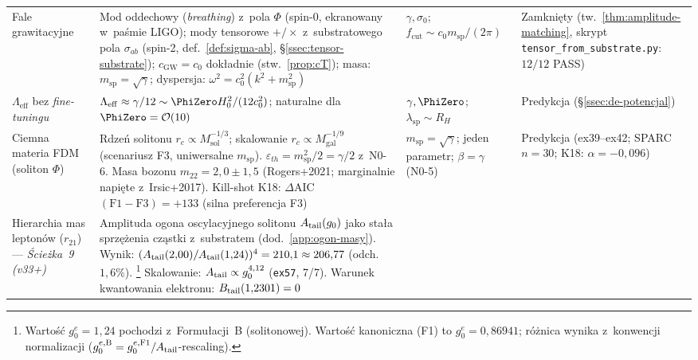 \begin{center}
\begin{tabular}{@{}>{\raggedright}p{2.5cm}p{5.5cm}p{2.2cm}p{2.5cm}@{}}
Fale grawitacyjne
  & Mod oddechowy (\emph{breathing}) z~pola $\Phi$ (spin-0,
    ekranowany w~pa\'smie LIGO); mody tensorowe $+/\times$
    z~substratowego pola $\sigma_{ab}$ (spin-2,
    def.~\ref{def:sigma-ab}, \S\ref{ssec:tensor-substrate});
    $c_{\mathrm{GW}} = c_0$ dok\l{}adnie (stw.~\ref{prop:cT});
    masa: $m_{\mathrm{sp}} = \sqrt{\gamma}$;
    dyspersja: $\omega^2 = c_0^2(k^2 + m_{\mathrm{sp}}^2)$
  & $\gamma, \sigma_0$;\newline $f_{\mathrm{cut}} \sim c_0 m_{\mathrm{sp}}/(2\pi)$
  & Zamkni\k{e}ty (tw.~\ref{thm:amplitude-matching}, skrypt \texttt{tensor\_from\_substrate.py}: $12/12$ PASS) \\[4pt]
$\Lambda_{\mathrm{eff}}$ bez \emph{fine-tuningu}
  & $\Lambda_{\mathrm{eff}} \approx \gamma/12
    \sim \PhiZero H_0^2/(12 c_0^2)$;
    naturalne dla $\PhiZero = \mathcal{O}(10)$
  & $\gamma, \PhiZero$;\newline
    $\lambda_{\mathrm{sp}} \sim R_H$
  & Predykcja (\S\ref{ssec:de-potencjal}) \\[4pt]
Ciemna materia FDM (soliton $\Phi$)
  & Rdze\'n solitonu $r_c \propto M_{\mathrm{sol}}^{-1/3}$;
    skalowanie $r_c \propto M_{\mathrm{gal}}^{-1/9}$
    (scenariusz F3, uniwersalne $m_{\mathrm{sp}}$).
    $\varepsilon_{th} = m_{\mathrm{sp}}^2/2 = \gamma/2$ z~N0-6.
    Masa bozonu $m_{22} = 2{,}0 \pm 1{,}5$
    (Rogers+2021; marginalnie napi\k{e}te z~Irsic+2017).
    Kill-shot K18: $\Delta$AIC$(\mathrm{F1-F3}) = +133$
    (silna preferencja F3)
  & $m_{\mathrm{sp}} = \sqrt{\gamma}$;\newline
    jeden parametr;\newline
    $\beta = \gamma$ (N0-5)
  & Predykcja (ex39--ex42;\newline
    SPARC $n=30$;\newline
    K18: $\alpha=-0{,}096$) \\[4pt]
Hierarchia mas lepton\'ow ($r_{21}$) --- \emph{\'Scie\.zka~9 (v33+)}
  & Amplituda ogona oscylacyjnego solitonu $A_{\rm tail}(g_0)$ jako
    sta\l{}a sprz\k{e}\.zenia cz\k{a}stki z~substratem
    (dod.~\ref{app:ogon-masy}).
    Wynik: $(A_{\rm tail}(2{,}00)/A_{\rm tail}(1{,}24))^4
    = 210{,}1 \approx 206{,}77$
    (odch.\ $1{,}6\%$).%
    \footnote{Warto\'s\'c $g_0^e = 1{,}24$ pochodzi z~Formu\l{}acji~B
    (solitonowej). Warto\'s\'c kanoniczna (F1) to $g_0^e = 0{,}86941$;
    r\'o\.znica wynika z~konwencji normalizacji
    ($g_0^{e,\mathrm{B}} = g_0^{e,\mathrm{F1}} / A_{\rm tail}$-rescaling).}
    Skalowanie: $A_{\rm tail} \propto g_0^{4{,}12}$ (\texttt{ex57}, 7/7).
    Warunek kwantowania elektronu: $B_{\rm tail}(1{,}2301) = 0$

\end{tabular}
\end{center}
